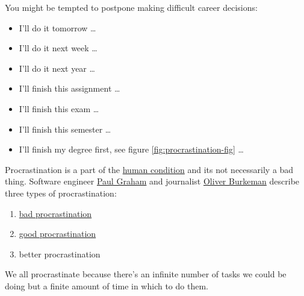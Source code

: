 \documentclass[
]{book}
\providecommand{\tightlist}{%
  \setlength{\itemsep}{0pt}\setlength{\parskip}{0pt}}
\begin{document}
You might be tempted to postpone making difficult career decisions:

\begin{itemize}
\tightlist
\item
  I'll do it tomorrow \ldots{}
\item
  I'll do it next week \ldots{}
\item
  I'll do it next year \ldots{}
\item
  I'll finish this assignment \ldots{}
\item
  I'll finish this exam \ldots{}
\item
  I'll finish this semester \ldots{}
\item
  I'll finish my degree first, see figure \ref{fig:procrastination-fig} \ldots{}
\end{itemize}

Procrastination is a part of the \href{https://en.wikipedia.org/wiki/Human_condition}{human condition} and its not necessarily a bad thing. Software engineer \href{https://en.wikipedia.org/wiki/Paul_Graham_(programmer)}{Paul Graham} and journalist \href{https://en.wikipedia.org/wiki/Oliver_Burkeman}{Oliver Burkeman} describe three types of procrastination:

\begin{enumerate}
\def\labelenumi{\arabic{enumi}.}
\tightlist
\item
  \href{http://paulgraham.com/procrastination.html}{bad procrastination} \citep{procrastination}
\item
  \href{http://paulgraham.com/procrastination.html}{good procrastination} \citep{procrastination}
\item
  better procrastination \citep{fourthousandweeks}
\end{enumerate}

We all procrastinate because there's an infinite number of tasks we could be doing but a finite amount of time in which to do them.
\end{document}
